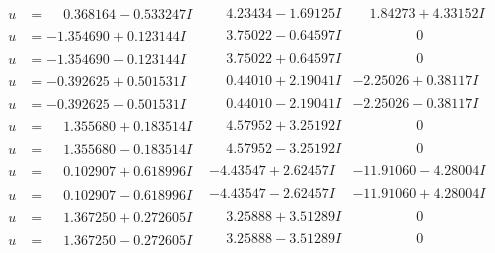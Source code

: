 \documentclass[1p]{elsarticle_modified}
\theoremstyle{definition}
\begin{document}
$$\begin{array}{c|c|c}
\begin{aligned}
u &= \phantom{-}0.368164 - 0.533247 I\end{aligned}
 & \phantom{-}4.23434 - 1.69125 I & \phantom{-}1.84273 + 4.33152 I \\ \hline\begin{aligned}
u &= -1.354690 + 0.123144 I\end{aligned}
 & \phantom{-}3.75022 - 0.64597 I & \phantom{-0.000000 } 0 \\ \hline\begin{aligned}
u &= -1.354690 - 0.123144 I\end{aligned}
 & \phantom{-}3.75022 + 0.64597 I & \phantom{-0.000000 } 0 \\ \hline\begin{aligned}
u &= -0.392625 + 0.501531 I\end{aligned}
 & \phantom{-}0.44010 + 2.19041 I & -2.25026 + 0.38117 I \\ \hline\begin{aligned}
u &= -0.392625 - 0.501531 I\end{aligned}
 & \phantom{-}0.44010 - 2.19041 I & -2.25026 - 0.38117 I \\ \hline\begin{aligned}
u &= \phantom{-}1.355680 + 0.183514 I\end{aligned}
 & \phantom{-}4.57952 + 3.25192 I & \phantom{-0.000000 } 0 \\ \hline\begin{aligned}
u &= \phantom{-}1.355680 - 0.183514 I\end{aligned}
 & \phantom{-}4.57952 - 3.25192 I & \phantom{-0.000000 } 0 \\ \hline\begin{aligned}
u &= \phantom{-}0.102907 + 0.618996 I\end{aligned}
 & -4.43547 + 2.62457 I & -11.91060 - 4.28004 I \\ \hline\begin{aligned}
u &= \phantom{-}0.102907 - 0.618996 I\end{aligned}
 & -4.43547 - 2.62457 I & -11.91060 + 4.28004 I \\ \hline\begin{aligned}
u &= \phantom{-}1.367250 + 0.272605 I\end{aligned}
 & \phantom{-}3.25888 + 3.51289 I & \phantom{-0.000000 } 0 \\ \hline\begin{aligned}
u &= \phantom{-}1.367250 - 0.272605 I\end{aligned}
 & \phantom{-}3.25888 - 3.51289 I & \phantom{-0.000000 } 0 \\ \hline\begin{aligned}

\end{aligned}
\end{array}$$
\end{document}
